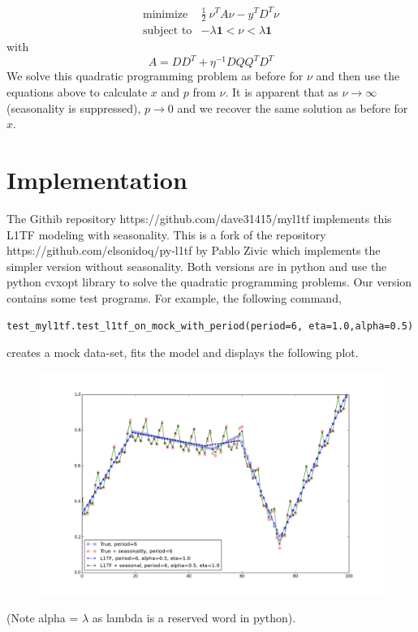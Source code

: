 \documentclass{article}
\begin{document}
\begin{eqnarray}
\mbox{minimize} & \frac{1}{2} ~ \nu^T A \nu - y^T D^T \nu \\
\mbox{subject to} & - \lambda \mathbf{1} < \nu < \lambda \mathbf{1}
\end{eqnarray}
with
\[
A = D D^T + \eta^{-1} D Q Q^T D^T
\]
We solve this quadratic programming problem as before for $\nu$ and then use the equations above
to calculate $x$ and $p$ from $\nu$. It is apparent that as $\nu \rightarrow \infty$ (seasonality is suppressed),
$p \rightarrow 0$ and we recover the same solution as before for $x$.

\section{Implementation}
The Githib repository https://github.com/dave31415/myl1tf implements this
L1TF modeling with seasonality. This is a fork of the repository
https://github.com/elsonidoq/py-l1tf by Pablo Zivic which implements the
simpler version without seasonality. Both versions are in python and
use the python cvxopt library to solve the quadratic programming problems. Our
version contains some test programs. For example, the following command,
\begin{verbatim}
test_myl1tf.test_l1tf_on_mock_with_period(period=6, eta=1.0,alpha=0.5)
\end{verbatim}
creates a mock data-set, fits the model and displays the following plot.
\begin{figure}
\centering
\includegraphics[width=500pt]{example.png}
\end{figure}
(Note alpha = $\lambda$ as lambda is a reserved word in python).
\end{document}
